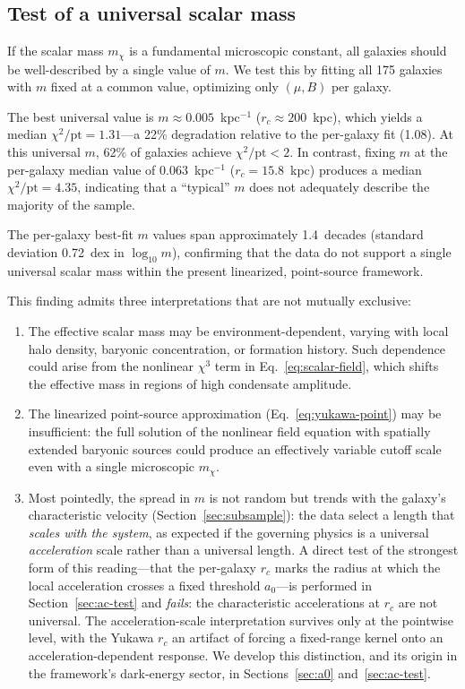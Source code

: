 \documentclass[11pt,a4paper]{article}
\begin{document}
\subsection{Test of a universal scalar mass}
\label{sec:universal-m}

If the scalar mass $m_\chi$ is a fundamental microscopic constant,
all galaxies should be well-described by a single value of $m$.
We test this by fitting all 175 galaxies with $m$ fixed at a
common value, optimizing only $(\mu, B)$ per galaxy.

The best universal value is $m \approx 0.005$~kpc$^{-1}$
($r_c \approx 200$~kpc), which yields a median
$\chi^2/\mathrm{pt} = 1.31$---a 22\% degradation relative to
the per-galaxy fit (1.08).
At this universal $m$, 62\% of galaxies achieve
$\chi^2/\mathrm{pt} < 2$.
In contrast, fixing $m$ at the per-galaxy median value of
$0.063$~kpc$^{-1}$ ($r_c = 15.8$~kpc) produces a median
$\chi^2/\mathrm{pt} = 4.35$, indicating that a ``typical'' $m$
does not adequately describe the majority of the sample.

The per-galaxy best-fit $m$ values span approximately 1.4~decades
(standard deviation 0.72~dex in $\log_{10}m$), confirming that
the data do not support a single universal scalar mass within the
present linearized, point-source framework.

This finding admits three interpretations that are not mutually
exclusive:
\begin{enumerate}
\item The effective scalar mass may be environment-dependent,
  varying with local halo density, baryonic concentration,
  or formation history. Such dependence could arise from the
  nonlinear $\chi^3$ term in Eq.~\eqref{eq:scalar-field},
  which shifts the effective mass in regions of high condensate
  amplitude.
\item The linearized point-source approximation
  (Eq.~\ref{eq:yukawa-point}) may be insufficient: the full
  solution of the nonlinear field equation with spatially
  extended baryonic sources could produce an effectively
  variable cutoff scale even with a single microscopic $m_\chi$.
\item Most pointedly, the spread in $m$ is not random but trends
  with the galaxy's characteristic velocity
  (Section~\ref{sec:subsample}): the data select a length that
  \emph{scales with the system}, as expected if the governing
  physics is a universal \emph{acceleration} scale rather than a
  universal length.  A direct test of the strongest form of this
  reading---that the per-galaxy $r_c$ marks the radius at which the
  local acceleration crosses a fixed threshold $a_0$---is performed
  in Section~\ref{sec:ac-test} and \emph{fails}: the characteristic
  accelerations at $r_c$ are not universal.  The acceleration-scale
  interpretation survives only at the pointwise level, with the
  Yukawa $r_c$ an artifact of forcing a fixed-range kernel onto an
  acceleration-dependent response.  We develop this distinction,
  and its origin in the framework's dark-energy sector, in
  Sections~\ref{sec:a0} and~\ref{sec:ac-test}.
\end{enumerate}
\end{document}
